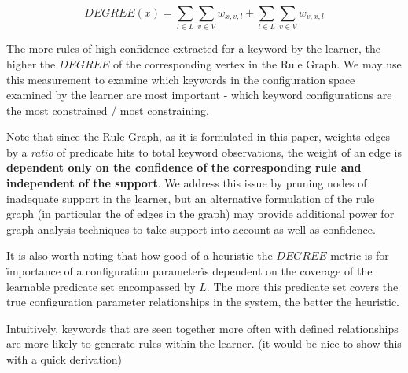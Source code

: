     $$DEGREE(x) = \sum_{l \in L} \sum_{v \in V} w_{x, v, l} + \sum_{l \in L} \sum_{v \in V} w_{v, x, l}$$

\iffalse

Note that we will be summing in-degree and out-degree over all
relationships $l$ to determine the total importance of
a keyword $k$ in the configuration space. We are restricted
by the total set of learning modules from which to derive
relationships $l$. If a keyword were highly constrained by some
relationship to other keywords in a way that might not be
measurable by current techniques, the learner (and therefore
consequently the graph) will show these keywords as being
unrelated.

\fi


The more rules of high confidence extracted for a keyword by the learner, 
the higher the $DEGREE$ of the corresponding vertex in the Rule Graph.
We may use this measurement to examine which keywords in the configuration
space examined by the learner are most important - which keyword configurations
are the most constrained / most constraining.

Note that since the Rule Graph, as it is formulated in this paper, weights edges
by a {\it ratio} of predicate hits to total keyword observations, the weight
of an edge is {\bf dependent only on the confidence of the corresponding rule
and independent of the support}. We address this issue by pruning nodes of
inadequate support in the learner, but an alternative formulation of the rule
graph (in particular the  of edges in the graph) may provide additional
power for graph analysis techniques to take support into account
as well as confidence.


It is also worth noting that how good of a heuristic the $DEGREE$ metric is for
\"importance of a configuration parameter\" is dependent on the coverage
of the learnable predicate set encompassed by $L$. The more this predicate
set covers the true configuration parameter relationships in the system,
the better the heuristic.

\iffalse

Intuitively, keywords that are seen together more often with defined relationships are more likely to generate rules within the learner.
 (it would be nice to show this with a quick derivation)

